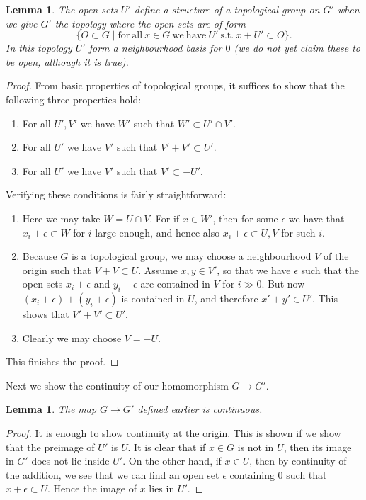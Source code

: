 \documentclass[12pt,a4paper,leqno]{article}
\theoremstyle{plain}
\newtheorem{lem}[theo]{Lemma}
\theoremstyle{definition}
\theoremstyle{remark}
\begin{document}
\begin{lem}\label{TopGroupFromNbhd}
The open sets $U'$ define a structure of a topological group on $G'$ when we give $G'$ the topology where the open sets are of form
\begin{equation*}
\{O \subset G \mid \mathrm{for \ all \ } x \in G \mathrm{\ we \ have \ } U' \mathrm{\ s.t. \ } x+U' \subset O \}.
\end{equation*}
In this topology $U'$ form a neighbourhood basis for $0$ (we do not yet claim these to be open, although it is true).
\end{lem}
\begin{proof}
From basic properties of topological groups, it suffices to show that the following three properties hold:
\begin{enumerate}
\item For all $U',V'$ we have $W'$ such that $W' \subset U' \cap V'$.
\item For all $U'$ we have $V'$ such that $V'+V' \subset U'$.
\item For all $U'$ we have $V'$ such that $V' \subset -U'$.
\end{enumerate}
Verifying these conditions is fairly straightforward:

\begin{enumerate}
\item Here we may take $W = U \cap V$. For if $x \in W'$, then for some $\epsilon$ we have that $x_i + \epsilon \subset W$ for $i$ large enough, and hence also $x_i + \epsilon \subset U,V$ for such $i$.

\item Because $G$ is a topological group, we may choose a neighbourhood $V$ of the origin such that $V+V \subset U$. Assume $x,y \in V'$, so that we have $\epsilon$ such that the open sets $x_i + \epsilon$ and $y_i + \epsilon$ are contained in $V$ for $i \gg 0$. But now $(x_i + \epsilon) + (y_i + \epsilon)$ is contained in $U$, and therefore $x' + y' \in U'$. This shows that $V'+V' \subset U'$.

\item Clearly we may choose $V = -U$. 
\end{enumerate}
This finishes the proof.
\end{proof}



Next we show the continuity of our homomorphism $G \to G'$.

\begin{lem}\label{SeqCont}
The map $G \to G'$ defined earlier is continuous.
\end{lem}
\begin{proof}
It is enough to show continuity at the origin. This is shown if we show that the preimage of $U'$ is $U$. It is clear that if $x \in G$ is not in $U$, then its image in $G'$ does not lie inside $U'$. On the other hand, if $x \in U$, then by continuity of the addition, we see that we can find an open set $\epsilon$ containing $0$ such that $x + \epsilon \subset U$. Hence the image of $x$ lies in $U'$.
\end{proof}
\end{document}
